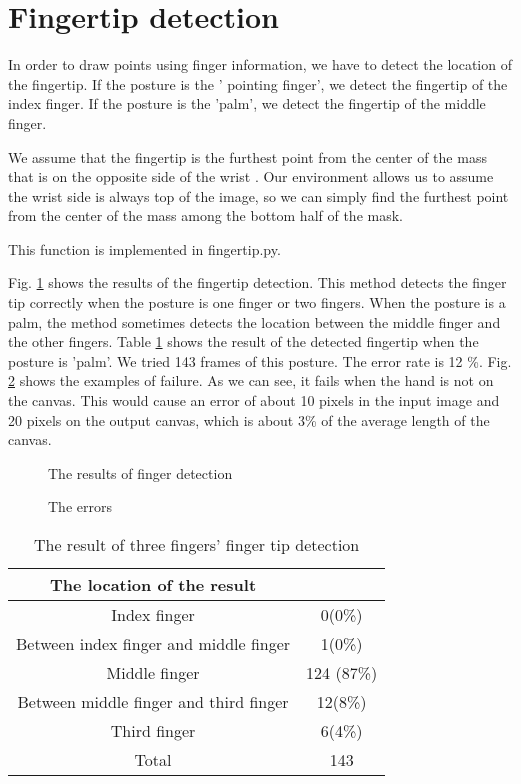 \section{Fingertip detection}
In order to draw points using finger information, we have to detect the location of the fingertip.
If the posture is the ' pointing finger', we detect the fingertip of the index finger. 
If the posture is the 'palm', we detect the fingertip of the middle finger. \par
We assume that the fingertip is the furthest point from the center of the mass that is on the opposite side of the wrist .
Our environment allows us to assume the wrist side is always top of the image, so we can simply find the furthest point from the center of the mass among the bottom half of the mask.

This function is implemented in fingertip.py. 

Fig. \ref{fig:finger} shows the results of the fingertip detection.
This method detects the finger tip correctly when the posture is one finger or two fingers.
When the posture is a palm, the method sometimes detects the location between the middle finger and the other fingers.
Table \ref{tb:finger} shows the result of the detected fingertip when the posture is 'palm'.
We tried 143 frames of this posture.
The error rate is 12 \%. Fig. \ref{fig:errorfinger} shows the examples of failure. As we can see, it fails when the hand is not on the canvas. This would cause an error of about 10 pixels in the input  image and 20 pixels on the output canvas, which is about 3\% of the average length of the canvas.

\begin{figure}[htbp]
 \centering
 
 \caption{The results of finger detection}
\label{fig:finger}
\end{figure}

\begin{figure}[htbp]
 \centering
 
 \caption{The errors}
\label{fig:errorfinger}
\end{figure}

\begin{table}
 \caption{The result of three fingers' finger tip detection}
 \label{tb:finger}
 \begin{tabular}{|c|c|}
 \hline
 The location of the result &  \\ \hline
 Index finger & 0(0\%) \\ \hline
 Between index finger and middle finger & 1(0\%) \\ \hline
 Middle finger & 124 (87\%) \\ \hline
 Between middle finger and third finger & 12(8\%) \\ \hline
 Third finger & 6(4\%) \\ \hline
 Total & 143 \\ \hline
 \end{tabular}
\end{table}
